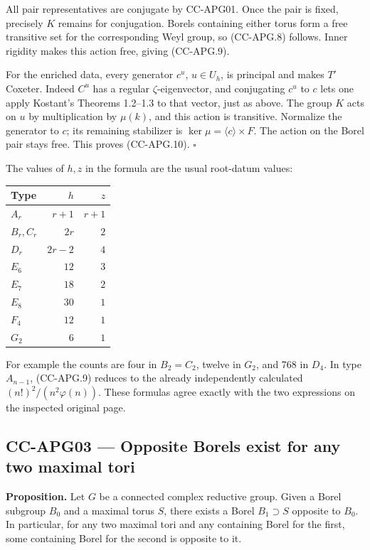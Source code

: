 \documentclass[11pt,a4paper]{article}
\theoremstyle{definition}\newtheorem{definition}[theorem]{Definition}
\theoremstyle{remark}\newtheorem{remark}[theorem]{Remark}
\begin{document}
All pair representatives are conjugate by CC-APG01. Once the pair is
fixed, precisely \(K\) remains for conjugation. Borels containing either
torus form a free transitive set for the corresponding Weyl group, so
(CC-APG.8) follows. Inner rigidity makes this action free, giving
(CC-APG.9).

For the enriched data, every generator \(c^u\), \(u\in U_h\), is
principal and makes \(T'\) Coxeter. Indeed \(C^u\) has a regular
\(\zeta\)-eigenvector, and conjugating \(c^u\) to \(c\) lets one apply
Kostant's Theorems 1.2--1.3 to that vector, just as above. The group
\(K\) acts on \(u\) by multiplication by \(\mu(k)\), and this action is
transitive. Normalize the generator to \(c\); its remaining stabilizer
is \(\ker\mu=\langle c\rangle\times F\). The action on the Borel pair
stays free. This proves (CC-APG.10). \(\square\)

The values of \(h,z\) in the formula are the usual root-datum values:

\begin{longtable}[]{@{}lrr@{}}
\toprule\noalign{}
Type & \(h\) & \(z\) \\
\midrule\noalign{}
\endhead
\bottomrule\noalign{}
\endlastfoot
\(A_r\) & \(r+1\) & \(r+1\) \\
\(B_r,C_r\) & \(2r\) & \(2\) \\
\(D_r\) & \(2r-2\) & \(4\) \\
\(E_6\) & \(12\) & \(3\) \\
\(E_7\) & \(18\) & \(2\) \\
\(E_8\) & \(30\) & \(1\) \\
\(F_4\) & \(12\) & \(1\) \\
\(G_2\) & \(6\) & \(1\) \\
\end{longtable}

For example the counts are four in \(B_2=C_2\), twelve in \(G_2\), and
768 in \(D_4\). In type \(A_{n-1}\), (CC-APG.9) reduces to the already
independently calculated \((n!)^2/(n^2\varphi(n))\). These formulas
agree exactly with the two expressions on the inspected original page.

\subsection{CC-APG03 --- Opposite Borels exist for any two maximal
tori}\label{cc-apg03-opposite-borels-exist-for-any-two-maximal-tori}

\textbf{Proposition.} Let \(G\) be a connected complex reductive group.
Given a Borel subgroup \(B_0\) and a maximal torus \(S\), there exists a
Borel \(B_1\supset S\) opposite to \(B_0\). In particular, for any two
maximal tori and any containing Borel for the first, some containing
Borel for the second is opposite to it.
\end{document}
